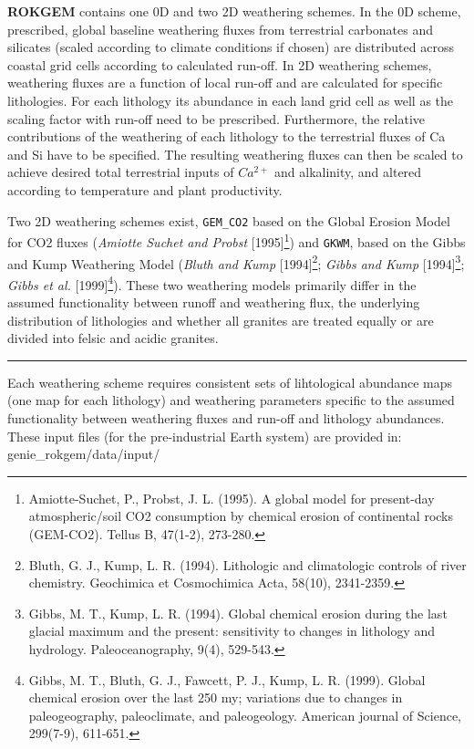 \textbf{ROKGEM} contains one 0D and two 2D weathering schemes. In the 0D scheme, prescribed, global baseline weathering fluxes from terrestrial carbonates and silicates (scaled according to climate conditions if chosen) are distributed across coastal grid cells according to calculated run-off. In 2D weathering schemes, weathering fluxes are a function of local run-off and are calculated for specific lithologies. For each lithology its abundance in each land grid cell as well as the scaling factor with run-off need to be prescribed. Furthermore, the relative contributions of the weathering of each lithology to the terrestrial fluxes of Ca and Si have to be specified. The resulting weathering fluxes can then be scaled to achieve desired total terrestrial inputs of \(Ca^{2+}\) and alkalinity, and altered according to temperature and plant productivity.

Two 2D weathering schemes exist, \texttt{GEM\_CO2} based on the Global Erosion Model for CO2 fluxes (\textit{Amiotte Suchet and Probst} [1995]\footnote{Amiotte-Suchet, P., Probst, J. L. (1995). A global model for present-day atmospheric/soil CO2 consumption by chemical erosion of continental rocks (GEM-CO2). Tellus B, 47(1-2), 273-280.}) and \texttt{GKWM}, based on the Gibbs and Kump Weathering Model (\textit{Bluth and Kump} [1994]\footnote{Bluth, G. J., Kump, L. R. (1994). Lithologic and climatologic controls of river chemistry. Geochimica et Cosmochimica Acta, 58(10), 2341-2359.}; \textit{Gibbs and Kump} [1994]\footnote{Gibbs, M. T., Kump, L. R. (1994). Global chemical erosion during the last glacial maximum and the present: sensitivity to changes in lithology and hydrology. Paleoceanography, 9(4), 529-543.}; \textit{Gibbs et al.} [1999]\footnote{Gibbs, M. T., Bluth, G. J., Fawcett, P. J., Kump, L. R. (1999). Global chemical erosion over the last 250 my; variations due to changes in paleogeography, paleoclimate, and paleogeology. American journal of Science, 299(7-9), 611-651.}). These two weathering models primarily differ in the assumed functionality between runoff and weathering flux, the underlying distribution of lithologies and whether all granites are treated equally or are divided into felsic and acidic granites.

\vspace{1mm}
\noindent\rule{4cm}{0.5pt}
\vspace{2mm}

\noindent Each weathering scheme requires consistent sets of lihtological abundance maps (one map for each lithology) and weathering parameters specific to the assumed functionality between weathering fluxes and run-off and lithology abundances. These input files (for the pre-industrial Earth system) are provided in: \textsf{\footnotesize genie\_rokgem/data/input/}

